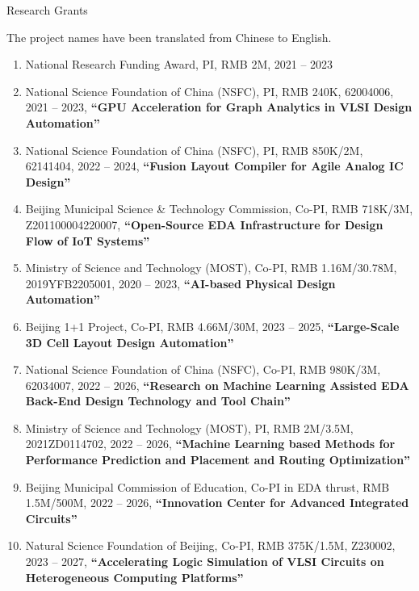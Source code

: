 \begin{rSection}{Research Grants}

  The project names have been translated from Chinese to English. 

\begin{enumerate}[font=\normalfont]

\item National Research Funding Award, PI, RMB 2M, 2021 -- 2023

\item National Science Foundation of China (NSFC), PI, RMB 240K, 62004006, 2021 -- 2023, \textbf{``GPU Acceleration for Graph Analytics in VLSI Design Automation''}

\item National Science Foundation of China (NSFC), PI, RMB 850K/2M, 62141404, 2022 -- 2024, \textbf{``Fusion Layout Compiler for Agile Analog IC Design''}

\item Beijing Municipal Science \& Technology Commission, Co-PI, RMB 718K/3M, Z201100004220007, \textbf{``Open-Source EDA Infrastructure for Design Flow of IoT Systems''}

\item Ministry of Science and Technology (MOST), Co-PI, RMB 1.16M/30.78M, 2019YFB2205001, 2020 -- 2023, \textbf{``AI-based Physical Design Automation''}

\item Beijing 1+1 Project, Co-PI, RMB 4.66M/30M, 2023 -- 2025, \textbf{``Large-Scale 3D Cell Layout Design Automation''}

\item National Science Foundation of China (NSFC), Co-PI, RMB 980K/3M, 62034007, 2022 -- 2026, \textbf{``Research on Machine Learning Assisted EDA Back-End Design Technology and Tool Chain''}

\item Ministry of Science and Technology (MOST), PI, RMB 2M/3.5M, 2021ZD0114702, 2022 -- 2026, \textbf{``Machine Learning based Methods for Performance Prediction and Placement and Routing Optimization''}

\item Beijing Municipal Commission of Education, Co-PI in EDA thrust, RMB 1.5M/500M, 2022 -- 2026, \textbf{``Innovation Center for Advanced Integrated Circuits''}

\item Natural Science Foundation of Beijing, Co-PI, RMB 375K/1.5M, Z230002, 2023 -- 2027, \textbf{``Accelerating Logic Simulation of VLSI Circuits on Heterogeneous Computing Platforms''}


\end{enumerate}
\end{rSection}
